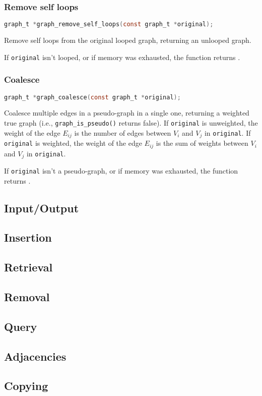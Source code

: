 \subsubsection{Remove self loops}

\begin{lstlisting}[language=C,frame=single]
  graph_t *graph_remove_self_loops(const graph_t *original);
\end{lstlisting}

  Remove self loops from the original looped graph, returning an unlooped graph.
  
  If \lstinline!original! isn't looped, or if memory was exhausted, the function returns \NULL.

\subsubsection{Coalesce}

\begin{lstlisting}[language=C,frame=single]
  graph_t *graph_coalesce(const graph_t *original);
\end{lstlisting}

  Coalesce multiple edges in a pseudo-graph in a single one, returning a weighted true graph (i.e., \lstinline!graph_is_pseudo()! returns false).
  If \lstinline!original! is unweighted, the weight of the edge $E_{ij}$ is the number of edges between $V_i$ and $V_j$ in \lstinline!original!.
  If \lstinline!original! is weighted, the weight of the edge $E_{ij}$ is the sum of weights between $V_i$ and $V_j$ in \lstinline!original!.
  
  If \lstinline!original! isn't a pseudo-graph, or if memory was exhausted, the function returns \NULL.

\subsection{Input/Output}
\label{sec:graph-io}

\subsection{Insertion}
\label{sec:graph-insertion}

\subsection{Retrieval}
\label{sec:graph-retrieval}

\subsection{Removal}
\label{sec:graph-removal}

\subsection{Query}
\label{sec:graph-query}

\subsection{Adjacencies}
\label{sec:graph-adjacencies}

\subsection{Copying}
\label{sec:graph-copying}
